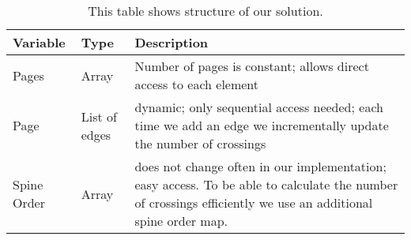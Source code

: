 \begin{table}
\centering
\begin{tabular}{llp{7cm}}
\toprule
\textbf{Variable} & \textbf{Type} & \textbf{Description} \\
\midrule
Pages & Array & Number of pages is constant; allows direct access to each element \\
Page & List of edges & dynamic; only sequential access needed; each time we add an edge we incrementally update the number of crossings \\
Spine Order & Array & does not change often in our implementation; easy access. To be able to calculate
the number of crossings efficiently we use an additional spine order map.\\

\bottomrule 

\end{tabular}

\caption{This table shows structure of our solution.}
\end{table}









              

